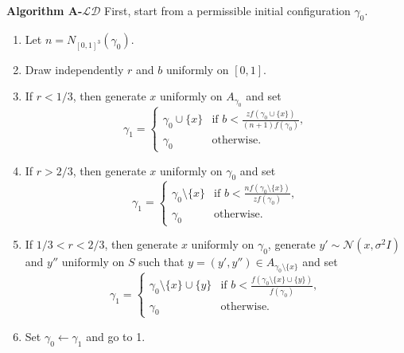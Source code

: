 \noindent \textbf{Algorithm A-$\mathcal{LD}$} \newline
\noindent First, start from a permissible initial configuration $\gamma_0$.
\begin{enumerate}
	\item Let $n = N_{[0,1]^3}(\gamma_0)$.
    \item Draw independently $r$ and $b$ uniformly on $[0,1]$.
    \item If $r<1/3$, then generate $x$ uniformly on $A_{\gamma_0}$ and set
        \begin{equation}\label{birth}
        \gamma_1 = 
        \left\{
            \begin{array}{ll}
                \gamma_0 \cup \{x\} & \mbox{if }  b < \frac{z f(\gamma_0 \cup \{x\})}{(n+1)f(\gamma_0)}, \\
                \gamma_0 & \mbox{otherwise. }
            \end{array}
        \right. 
        \end{equation}
    \item If $r>2/3$, then generate $x$ uniformly on $\gamma_0$ and set
        \begin{equation}\label{death}
        \gamma_1 = 
        \left\{
            \begin{array}{ll}
                \gamma_0 \setminus \{x\} & \mbox{if }  b < \frac{n f(\gamma_0 \setminus \{x\})}{zf(\gamma_0)}, \\
                \gamma_0 & \mbox{otherwise. }
            \end{array}
        \right. 
        \end{equation}
    \item If $1/3 < r < 2/3$, then generate $x$ uniformly on $\gamma_0$, generate $y'\sim \mathcal N (x, \sigma^2 I)$ and $y''$ uniformly on $S$ such that $y=(y',y'') \in A_{\gamma_0 \setminus \{x\}}$ and set
        \begin{equation}\label{move}
        \gamma_1 = 
        \left\{
            \begin{array}{ll}
                \gamma_0 \setminus \{x\} \cup \{y\} & \mbox{if }  b < \frac{f(\gamma_0 \setminus \{x\} \cup \{y\})}{f(\gamma_0)}, \\
                \gamma_0 & \mbox{otherwise. }
            \end{array}
        \right. 
        \end{equation}
    \item Set $\gamma_0 \leftarrow \gamma_1$ and go to 1.
\end{enumerate}

